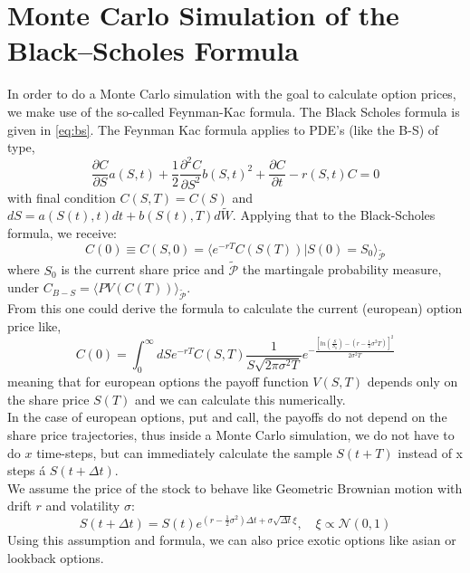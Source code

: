 \documentclass[11pt]{article}
\begin{document}
\section{Monte Carlo Simulation of the Black--Scholes Formula}
In order to do a Monte Carlo simulation with the goal to calculate option prices, we make use of the so-called Feynman-Kac formula. The Black Scholes formula is given in \ref{eq:bs}. The Feynman Kac formula applies to PDE's (like the B-S) of type,
\begin{equation}
    \frac{\partial C}{\partial S}a(S,t) + \frac{1}{2}\frac{\partial^2 C}{\partial S^2} b(S,t)^2 + \frac{\partial C}{\partial t} - r(S,t)C = 0
    \label{eq:kacreq}
\end{equation}
with final condition $C(S,T) = C(S)$ and $dS = a(S(t),t)dt + b(S(t),T)d\tilde{W}$. Applying that to the Black-Scholes formula, we receive:
\begin{equation}
    C(0) \equiv C(S,0) = \langle e^{-rT} C(S(T)) | S(0) = S_0 \rangle_{\mathcal{\tilde{P}}}
\end{equation}
where $S_0$ is the current share price and $\mathcal{\tilde{P}}$ the martingale probability measure, under $C_{B-S} = \langle PV(C(T))\rangle_{\mathcal{\tilde{P}}}$.\\
From this one could derive the formula to calculate the current (european) option price like,
\begin{equation}
    C(0) = \int_{0}^{\infty} dS e^{-rT}C(S,T) \frac{1}{S\sqrt{2\pi \sigma^2 T}} e^{-\frac{\left[ln(\frac{S}{S_0})-(r-\frac{1}{2}\sigma^2 T)\right]^2}{2\sigma^2 T}}
\end{equation}
meaning that for european options the payoff function $V(S,T)$ depends only on the share price $S(T)$ and we can calculate this numerically. \\
In the case of european options, put and call, the payoffs do not depend on the share price trajectories, thus inside a Monte Carlo simulation, we do not have to do $x$ time-steps, but can immediately calculate the sample $S(t+T)$ instead of x steps á $S(t+\Delta t)$. \\
We assume the price of the stock to behave like Geometric Brownian motion with drift $r$ and volatility $\sigma$:
\begin{equation}
    S(t+\Delta t) = S(t) e^{(r-\frac{1}{2}\sigma^2)\Delta t + \sigma \sqrt{\Delta t} \xi}, \quad \xi \propto \mathcal{N}(0,1)
    \label{mc:stockprice}
\end{equation}
Using this assumption and formula, we can also price exotic options like asian or lookback options.\\
\end{document}
